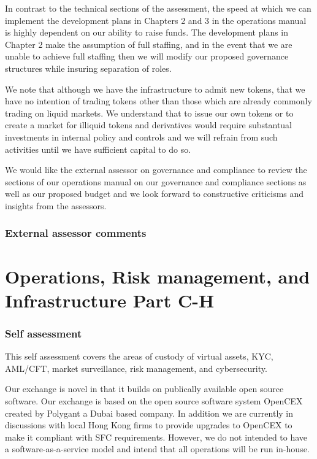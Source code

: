 \documentclass[]{report}
\begin{document}
In contrast to the technical sections of the assessment, the speed at
which we can implement the development plans in Chapters 2 and 3 in
the operations manual is highly dependent on our ability to raise
funds.  The development plans in Chapter 2 make the assumption of full
staffing, and in the event that we are unable to achieve full staffing
then we will modify our proposed governance structures while insuring
separation of roles.

We note that although we have the infrastructure to admit new tokens,
that we have no intention of trading tokens other than those which are
already commonly trading on liquid markets.  We understand that to
issue our own tokens or to create a market for illiquid tokens and
derivatives would require substantual investments in internal policy
and controls and we will refrain from such activities until we have
sufficient capital to do so.

We would like the external assessor on governance and compliance to
review the sections of our operations manual on our governance and
compliance sections as well as our proposed budget and we look forward
to constructive criticisms and insights from the assessors.

\subsection{External assessor comments}

\chapter{Operations, Risk management, and Infrastructure Part C-H}

\subsection{Self assessment}

This self assessment covers the areas of custody of virtual assets,
KYC, AML/CFT, market surveillance, risk management, and cybersecurity.

Our exchange is novel in that it builds on publically available open
source software.  Our exchange is based on the open source software
system OpenCEX created by Polygant a Dubai based company.  In addition
we are currently in discussions with local Hong Kong firms to provide
upgrades to OpenCEX to make it compliant with SFC requirements.
However, we do not intended to have a software-as-a-service model and
intend that all operations will be run in-house.
\end{document}
